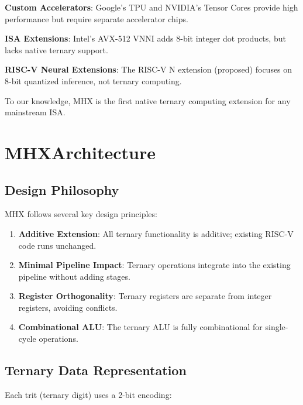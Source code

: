 \documentclass[conference,10pt]{IEEEtran}
\newcommand{\mhx}{\textsc{MHX\texttrademark}}
\newcommand{\riscv}{RISC-V}
\begin{document}
\textbf{Custom Accelerators}: Google's TPU \cite{jouppi2017datacenter} and NVIDIA's Tensor Cores provide high performance but require separate accelerator chips.

\textbf{ISA Extensions}: Intel's AVX-512 VNNI adds 8-bit integer dot products, but lacks native ternary support.

\textbf{RISC-V Neural Extensions}: The RISC-V N extension (proposed) focuses on 8-bit quantized inference, not ternary computing.

To our knowledge, \mhx{} is the first native ternary computing extension for any mainstream ISA.

\section{MHX\texttrademark Architecture}
\label{sec:architecture}

\subsection{Design Philosophy}

\mhx{} follows several key design principles:

\begin{enumerate}
    \item \textbf{Additive Extension}: All ternary functionality is additive; existing \riscv{} code runs unchanged.
    
    \item \textbf{Minimal Pipeline Impact}: Ternary operations integrate into the existing pipeline without adding stages.
    
    \item \textbf{Register Orthogonality}: Ternary registers are separate from integer registers, avoiding conflicts.
    
    \item \textbf{Combinational ALU}: The ternary ALU is fully combinational for single-cycle operations.
\end{enumerate}

\subsection{Ternary Data Representation}

Each trit (ternary digit) uses a 2-bit encoding:
\end{document}
